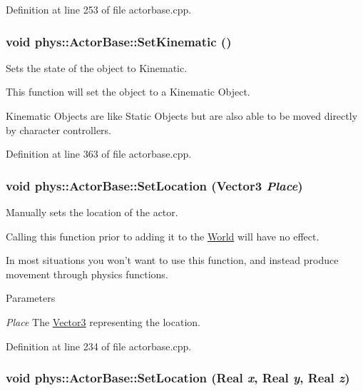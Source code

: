 Definition at line 253 of file actorbase.cpp.

\hypertarget{classphys_1_1ActorBase_acd5613286ec14fb2a8e5ed5f5003dc5f}{
\subsubsection[{SetKinematic}]{\setlength{\rightskip}{0pt plus 5cm}void phys::ActorBase::SetKinematic ()}}
\label{d8/d0f/classphys_1_1ActorBase_acd5613286ec14fb2a8e5ed5f5003dc5f}


Sets the state of the object to Kinematic. 

This function will set the object to a Kinematic Object. \par
 Kinematic Objects are like Static Objects but are also able to be moved directly by character controllers. 

Definition at line 363 of file actorbase.cpp.

\hypertarget{classphys_1_1ActorBase_a3212be459859a67bf7ae64919d58d5a5}{
\subsubsection[{SetLocation}]{\setlength{\rightskip}{0pt plus 5cm}void phys::ActorBase::SetLocation ({\bf Vector3} {\em Place})}}
\label{d8/d0f/classphys_1_1ActorBase_a3212be459859a67bf7ae64919d58d5a5}


Manually sets the location of the actor. 

Calling this function prior to adding it to the \hyperlink{classphys_1_1World}{World} will have no effect. \par
 In most situations you won't want to use this function, and instead produce movement through physics functions. 
\begin{DoxyParams}{Parameters}
\item[{\em Place}]The \hyperlink{classphys_1_1Vector3}{Vector3} representing the location. \end{DoxyParams}


Definition at line 234 of file actorbase.cpp.

\hypertarget{classphys_1_1ActorBase_a0b0db2ec0f4926326635b86f1ead2276}{
\subsubsection[{SetLocation}]{\setlength{\rightskip}{0pt plus 5cm}void phys::ActorBase::SetLocation ({\bf Real} {\em x}, \/  {\bf Real} {\em y}, \/  {\bf Real} {\em z})}}
\label{d8/d0f/classphys_1_1ActorBase_a0b0db2ec0f4926326635b86f1ead2276}


